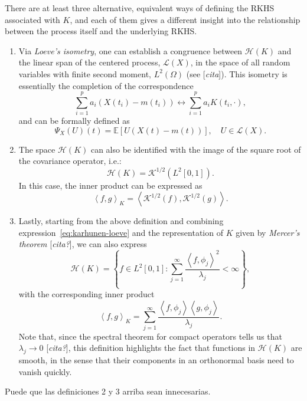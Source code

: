 \documentclass[ba]{imsart}
\numberwithin{equation}{section}
\theoremstyle{plain}
\newcommand{\E}{\mathbb{E}}
\newcommand\dotprod[2]{\left\langle #1, #2 \right\rangle}
\newenvironment{comment}
{
\noindent \em \color{red}
}
{
\color{black}
}
\newcommand\incomment[1]{\color{red}[\textit{#1}]\color{black}}
\begin{document}
There are at least three alternative, equivalent ways of defining the RKHS associated with \(K\), and each of them gives a different insight into the relationship between the process itself and the underlying RKHS.

\begin{enumerate}
  \item Via \textit{Loeve's isometry}, one can establish a congruence between \(\mathcal H(K)\) and the linear span of the centered process, \(\mathcal L(X)\), in the space of all random variables with finite second moment, \(L^2(\Omega)\) (see \incomment{cita}). This isometry is essentially the completion of the correspondence
  \[
  \sum_{i=1}^p a_i (X(t_i) - m(t_i)) \longleftrightarrow \sum_{i=1}^p a_i K(t_i, \cdot),
\]
and can be formally defined as
\begin{equation}\label{eq:loeves-isometry}
  \Psi_X(U)(t) = \E[U(X(t) - m(t))], \quad U \in \mathcal L(X).
\end{equation}
  \item The space \(\mathcal H(K)\) can also be identified with the image of the square root of the covariance operator, i.e.:
  \begin{equation}\label{eq:rkhs-square-root}
  \mathcal H(K) = \mathcal K^{1/2}(L^2[0, 1]).
\end{equation}
In this case, the inner product can be expressed as
\[
\dotprod{f}{g}_K = \dotprod{\mathcal K^{1/2}(f)}{\mathcal K^{1/2}(g)}.
\]

  \item Lastly, starting from the above definition and combining expression~\eqref{eq:karhunen-loeve} and the representation of \(K\) given by \textit{Mercer's theorem} \incomment{cita?}, we can also express
  \begin{equation}\label{rkhs-sum-lambda}
    \mathcal H(K) = \left\{f \in L^2[0, 1]: \sum_{j=1}^\infty \frac{\dotprod{f}{\phi_j}^2}{\lambda_j} < \infty \right\},
  \end{equation}
  with the corresponding inner product
  \[
  \dotprod{f}{g}_K = \sum_{j=1}^\infty \frac{\dotprod{f}
  {\phi_j}\dotprod{g}{\phi_j}}{\lambda_j}.
  \]
Note that, since the spectral theorem for compact operators tells us that \(\lambda_j \to 0\) \incomment{cita?}, this definition highlights the fact that functions in \(\mathcal H(K)\) are smooth, in the sense that their components in an orthonormal basis need to vanish quickly.
\end{enumerate}

\begin{comment}
  Puede que las definiciones 2 y 3 arriba sean innecesarias.
\end{comment}
\end{document}
